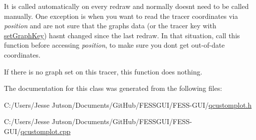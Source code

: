 It is called automatically on every redraw and normally doesn\textquotesingle{}t need to be called manually. One exception is when you want to read the tracer coordinates via {\itshape position} and are not sure that the graph\textquotesingle{}s data (or the tracer key with \hyperlink{class_q_c_p_item_tracer_a6840143b42f3b685cedf7c6d83a704c8}{set\+Graph\+Key}) hasn\textquotesingle{}t changed since the last redraw. In that situation, call this function before accessing {\itshape position}, to make sure you don\textquotesingle{}t get out-\/of-\/date coordinates.

If there is no graph set on this tracer, this function does nothing. 

The documentation for this class was generated from the following files\+:\begin{DoxyCompactItemize}
\item 
C\+:/\+Users/\+Jesse Jutson/\+Documents/\+Git\+Hub/\+F\+E\+S\+S\+G\+U\+I/\+F\+E\+S\+S-\/\+G\+U\+I/\hyperlink{qcustomplot_8h}{qcustomplot.\+h}\item 
C\+:/\+Users/\+Jesse Jutson/\+Documents/\+Git\+Hub/\+F\+E\+S\+S\+G\+U\+I/\+F\+E\+S\+S-\/\+G\+U\+I/\hyperlink{qcustomplot_8cpp}{qcustomplot.\+cpp}\end{DoxyCompactItemize}
